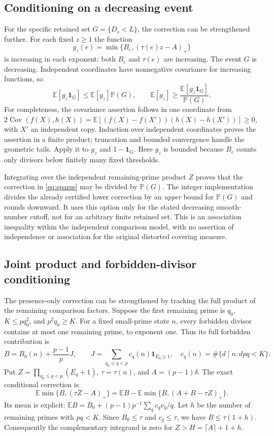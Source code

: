 \documentclass[11pt]{article}
\newcommand{\E}{\mathbb E}
\newcommand{\Pp}{\mathbb P}
\begin{document}
\subsection{Conditioning on a decreasing event}
For the specific retained set $G=\{D_s<L\}$, the correction can be
strengthened further. For each fixed $z\geq1$ the function
\[
 g_z(e)=\min\{B_e,(\tau(e)z-A)_+\}
\]
is increasing in each exponent: both $B_e$ and $\tau(e)$ are increasing.
The event $G$ is decreasing. Independent coordinates have nonnegative
covariance for increasing functions, so
\[
 \E[g_z\mathbf1_G]\leq\E[g_z]\Pp(G),\qquad
 \E[g_z]\geq\frac{\E[g_z\mathbf1_G]}{\Pp(G)}.
\]
For completeness, the covariance assertion follows in one coordinate from
$2\operatorname{Cov}(f(X),h(X))=
\E[(f(X)-f(X'))(h(X)-h(X'))]\geq0$, with $X'$ an independent copy.
Induction over independent coordinates proves the assertion in a finite
product; truncation and bounded convergence handle the geometric tails.
Apply it to $g_z$ and $1-\mathbf1_G$. Here $g_z$ is bounded because
$B_e$ counts only divisors below finitely many fixed thresholds.

Integrating over the independent remaining-prime product $Z$ proves that
the correction in \eqref{eq:sparse} may be divided by $\Pp(G)$.
The integer implementation divides the already certified lower correction
by an \emph{upper} bound for $\Pp(G)$ and rounds downward. It uses this
option only for the stated decreasing smooth-number cutoff, not for an
arbitrary finite retained set. This is an association inequality within
the independent comparison model, with no assertion of independence or
association for the original distorted covering measure.

\subsection{Joint product and forbidden-divisor conditioning}\label{sec:jointproduct}
The presence-only correction can be strengthened by tracking the full
product of the remaining comparison factors. Suppose the first remaining
prime is $q_0$, $K\leq pq_0^2$, and $p^2q_0\geq K$.
For a fixed small-prime state $n$, every forbidden divisor contains at most
one remaining prime, to exponent one. Thus its full forbidden contribution is
\[
 B=B_0(n)+\frac{p-1}{p}J,\qquad
 J=\sum_{q_0\leq q<p}c_q(n)\mathbf1_{E_q\geq1},\quad
 c_q(n)=\#\{d\mid n:dpq<K\}.
\]
Put $Z=\prod_{q_0\leq q<p}(E_q+1)$, $\tau=\tau(n)$, and
$A=(p-1)\delta$. The exact conditional correction is
\[
 \E\min\{B,(\tau Z-A)_+\}
 =\E B-\E\min\{B,(A+B-\tau Z)_+\}.
\]
Its mean is explicit:
$\E B=B_0+(p-1)p^{-1}\sum_q c_q\nu_q/q$.
Let $h$ be the number of remaining primes with $pq<K$. Since
$B_0\leq\tau$ and $c_q\leq\tau$, we have $B\leq\tau(1+h)$.
Consequently the complementary integrand is zero for
$Z>H=\lceil A\rceil+1+h$.
\end{document}
